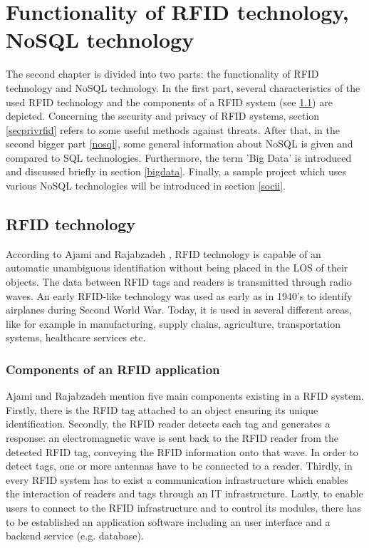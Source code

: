 \chapter{Functionality of RFID technology, NoSQL technology}
\label{Kap2}

The second chapter is divided into two parts: the functionality of RFID technology and NoSQL technology. In the first part, several characteristics of the used RFID technology and the components of a RFID system (see \ref{rfid_technology}) are depicted. Concerning the security and privacy of RFID systems, section \ref{secprivrfid} refers to some useful methods against threats. After that, in the second bigger part \ref{nosql}, some general information about NoSQL is given and compared to SQL technologies. Furthermore, the term 'Big Data' is introduced and discussed briefly in section \ref{bigdata}. Finally, a sample project which uses various NoSQL technologies will be introduced in section \ref{socii}.

\section{RFID technology} \label{rfid_technology}

According to Ajami and Rajabzadeh \cite{ncbi}, RFID technology is capable of an automatic unambiguous identifiation without being placed in the \ac{LOS} of their objects. The data between RFID tags and readers is transmitted through radio waves. An early RFID-like technology was used as early as in 1940's to identify airplanes during Second World War. Today, it is used in several different areas, like for example in manufacturing, supply chains, agriculture, transportation systems, healthcare services etc. 

\subsection{Components of an RFID application} 

Ajami and Rajabzadeh \cite{ncbi} mention five main components existing in a RFID system. Firstly, there is the RFID tag attached to an object ensuring its unique identification. Secondly, the RFID reader detects each tag and generates a response: an electromagnetic wave is sent back to the RFID reader from the detected RFID tag, conveying the RFID information onto that wave. In order to detect tags, one or more antennas have to be connected to a reader. Thirdly, in every RFID system has to exist a communication infrastructure which enables the interaction of readers and tags through an \ac{IT} infrastructure. Lastly, to enable users to connect to the RFID infrastructure and to control its modules, there has to be established an application software including an user interface and a backend service (e.g. database).

